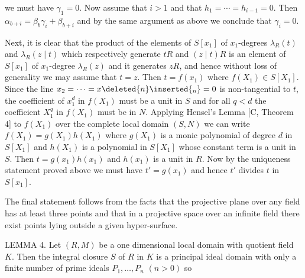 we must have $\gamma_1=0$. Now assume that $i>1$ and that $h_1=\cdots=h_{i-1}=0$. Then $\alpha_{b+i}=\beta_b\gamma_i+\beta_{b+i}$ and by the same argument as above we conclude that $\gamma_i=0$.

Next, it is clear that the product of the elements of $S[x_1]$ of $x_1$-degrees $\lambda_R(t)$ and $\lambda_R(z\mid t)$ which respectively generate $tR$ and $(z\mid t)R$ is an element of $S[x_1]$ of $x_1$-degree $\lambda_R(z)$ and it generates $zR$, and hence without loss of generality we may assume that $t=z$. Then $t=f(x_1)$ where $f(X_1)\in S[X_1]$. Since the line $x_2=\cdots=x\deleted{n}\inserted{{}_n}=0$ is non-tangential to $t$, the coefficient of $x_1^d$ in $f(X_1)$ must be a unit in $S$ and for all $q<d$ the coefficient  $X_1^q$ in $f(X_1)$ must be in $N$. Applying Hensel's Lemma [C, Theorem 4] to $f(X_1)$ over the complete local domain $(S,N)$ we can write $f(X_1)=g(X_1)h(X_1)$ where $g(X_1)$ is a monic polynomial of degree $d$ in $S[X_1]$ and $h(X_1)$ is a polynomial in $S[X_1]$ whose constant term is a unit in $S$. Then $t=g(x_1)h(x_1)$ and $h(x_1)$ is a unit in $R$. Now by the uniqueness statement proved above we must have $t'=g(x_1)$ and hence $t'$ divides $t$ in $S[x_1]$.

The final statement follows from the facts that the projective plane over any field has at least three points and that in a projective space over an infinite field there exist points lying outside a given hyper-surface.

LEMMA 4. Let $(R,M)$ be a one dimensional local domain with quotient field $K$. Then the integral closure $S$ of $R$ in $K$ is a principal ideal domain with only a finite number of prime ideals $P_1,\ldots,P_n$ $(n>0)$ so
